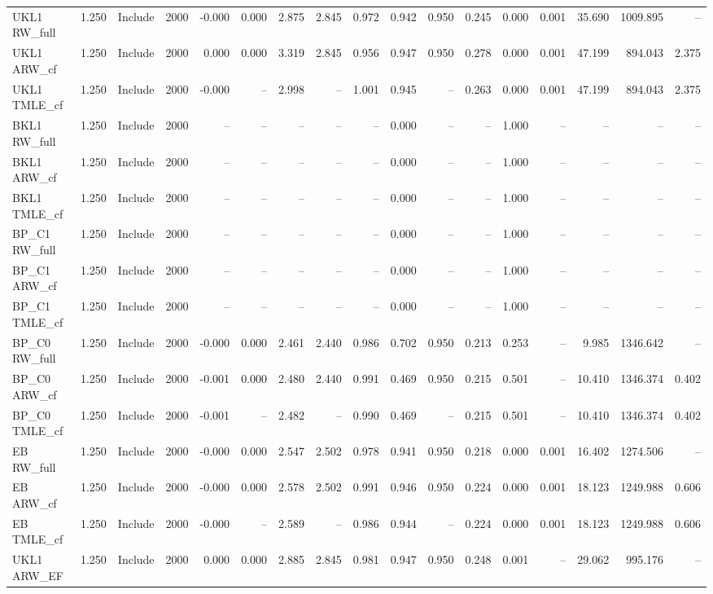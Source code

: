 \begin{tabular}{llllrrrrrrrrrrrrr}
UKL1 RW\_full & 1.250 & Include & 2000 & -0.000 & 0.000 & 2.875 & 2.845 & 0.972 & 0.942 & 0.950 & 0.245 & 0.000 & 0.001 & 35.690 & 1009.895 & -- \\
UKL1 ARW\_cf & 1.250 & Include & 2000 & 0.000 & 0.000 & 3.319 & 2.845 & 0.956 & 0.947 & 0.950 & 0.278 & 0.000 & 0.001 & 47.199 & 894.043 & 2.375 \\
UKL1 TMLE\_cf & 1.250 & Include & 2000 & -0.000 & -- & 2.998 & -- & 1.001 & 0.945 & -- & 0.263 & 0.000 & 0.001 & 47.199 & 894.043 & 2.375 \\
BKL1 RW\_full & 1.250 & Include & 2000 & -- & -- & -- & -- & -- & 0.000 & -- & -- & 1.000 & -- & -- & -- & -- \\
BKL1 ARW\_cf & 1.250 & Include & 2000 & -- & -- & -- & -- & -- & 0.000 & -- & -- & 1.000 & -- & -- & -- & -- \\
BKL1 TMLE\_cf & 1.250 & Include & 2000 & -- & -- & -- & -- & -- & 0.000 & -- & -- & 1.000 & -- & -- & -- & -- \\
BP\_C1 RW\_full & 1.250 & Include & 2000 & -- & -- & -- & -- & -- & 0.000 & -- & -- & 1.000 & -- & -- & -- & -- \\
BP\_C1 ARW\_cf & 1.250 & Include & 2000 & -- & -- & -- & -- & -- & 0.000 & -- & -- & 1.000 & -- & -- & -- & -- \\
BP\_C1 TMLE\_cf & 1.250 & Include & 2000 & -- & -- & -- & -- & -- & 0.000 & -- & -- & 1.000 & -- & -- & -- & -- \\
BP\_C0 RW\_full & 1.250 & Include & 2000 & -0.000 & 0.000 & 2.461 & 2.440 & 0.986 & 0.702 & 0.950 & 0.213 & 0.253 & -- & 9.985 & 1346.642 & -- \\
BP\_C0 ARW\_cf & 1.250 & Include & 2000 & -0.001 & 0.000 & 2.480 & 2.440 & 0.991 & 0.469 & 0.950 & 0.215 & 0.501 & -- & 10.410 & 1346.374 & 0.402 \\
BP\_C0 TMLE\_cf & 1.250 & Include & 2000 & -0.001 & -- & 2.482 & -- & 0.990 & 0.469 & -- & 0.215 & 0.501 & -- & 10.410 & 1346.374 & 0.402 \\
EB RW\_full & 1.250 & Include & 2000 & -0.000 & 0.000 & 2.547 & 2.502 & 0.978 & 0.941 & 0.950 & 0.218 & 0.000 & 0.001 & 16.402 & 1274.506 & -- \\
EB ARW\_cf & 1.250 & Include & 2000 & -0.000 & 0.000 & 2.578 & 2.502 & 0.991 & 0.946 & 0.950 & 0.224 & 0.000 & 0.001 & 18.123 & 1249.988 & 0.606 \\
EB TMLE\_cf & 1.250 & Include & 2000 & -0.000 & -- & 2.589 & -- & 0.986 & 0.944 & -- & 0.224 & 0.000 & 0.001 & 18.123 & 1249.988 & 0.606 \\
UKL1 ARW\_EF & 1.250 & Include & 2000 & 0.000 & 0.000 & 2.885 & 2.845 & 0.981 & 0.947 & 0.950 & 0.248 & 0.001 & -- & 29.062 & 995.176 & -- \\

\end{tabular}
